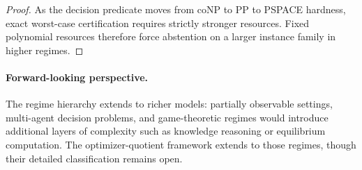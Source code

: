 
\begin{proof}
As the decision predicate moves from coNP to PP to PSPACE hardness, exact worst-case certification requires strictly stronger resources. Fixed polynomial resources therefore force abstention on a larger instance family in higher regimes.
\end{proof}

\paragraph{Forward-looking perspective.}
The regime hierarchy extends to richer models: partially observable settings, multi-agent decision problems, and game-theoretic regimes would introduce additional layers of complexity such as knowledge reasoning or equilibrium computation. The optimizer-quotient framework extends to those regimes, though their detailed classification remains open.
